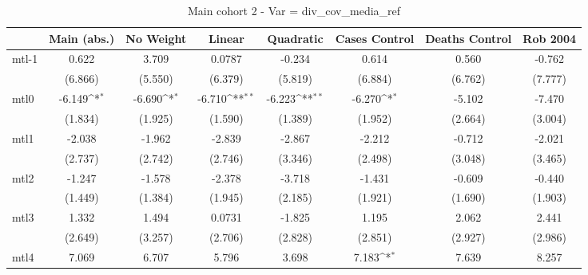 \documentclass{article}
\begin{document}
{
\def\sym#1{\ifmmode^{#1}\else\(^{#1}\)\fi}
\begin{longtable}{l*{7}{c}}
\caption{Main cohort 2 - Var = div\_cov\_media\_ref}\\
\hline\hline\endfirsthead\hline\endhead\hline\endfoot\endlastfoot
                &\multicolumn{1}{c}{Main (abs.)}&\multicolumn{1}{c}{No Weight}&\multicolumn{1}{c}{Linear}&\multicolumn{1}{c}{Quadratic}&\multicolumn{1}{c}{Cases Control}&\multicolumn{1}{c}{Deaths Control}&\multicolumn{1}{c}{Rob 2004}\\
\hline
mtl-1           &    0.622         &    3.709         &   0.0787         &   -0.234         &    0.614         &    0.560         &   -0.762         \\
                &  (6.866)         &  (5.550)         &  (6.379)         &  (5.819)         &  (6.884)         &  (6.762)         &  (7.777)         \\
mtl0            &   -6.149\sym{*}  &   -6.690\sym{*}  &   -6.710\sym{**} &   -6.223\sym{**} &   -6.270\sym{*}  &   -5.102         &   -7.470         \\
                &  (1.834)         &  (1.925)         &  (1.590)         &  (1.389)         &  (1.952)         &  (2.664)         &  (3.004)         \\
mtl1            &   -2.038         &   -1.962         &   -2.839         &   -2.867         &   -2.212         &   -0.712         &   -2.021         \\
                &  (2.737)         &  (2.742)         &  (2.746)         &  (3.346)         &  (2.498)         &  (3.048)         &  (3.465)         \\
mtl2            &   -1.247         &   -1.578         &   -2.378         &   -3.718         &   -1.431         &   -0.609         &   -0.440         \\
                &  (1.449)         &  (1.384)         &  (1.945)         &  (2.185)         &  (1.921)         &  (1.690)         &  (1.903)         \\
mtl3            &    1.332         &    1.494         &   0.0731         &   -1.825         &    1.195         &    2.062         &    2.441         \\
                &  (2.649)         &  (3.257)         &  (2.706)         &  (2.828)         &  (2.851)         &  (2.927)         &  (2.986)         \\
mtl4            &    7.069         &    6.707         &    5.796         &    3.698         &    7.183\sym{*}  &    7.639         &    8.257         \\

\end{longtable}}
\end{document}
